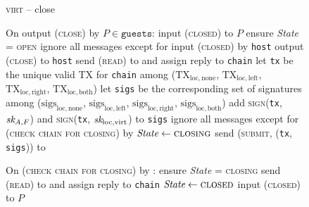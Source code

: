 \begin{figure}[H]
  \begin{processbox}{\textsc{virt} -- close}
    \begin{algorithmic}[1]
      \State On output (\textsc{close}) by $P \in \texttt{guests}$:
      \Indent
          \State input (\textsc{closed}) to $P$
        \EndIf
        \State ensure \textit{State} = \textsc{open}
         
          \State ignore all messages except for input (\textsc{closed}) by
          \texttt{host}
          \State output (\textsc{close}) to \texttt{host}
        \EndIf
        \State {}
        \State send (\textsc{read}) to \ledger and assign reply to
        \texttt{chain}
        \State let \texttt{tx} be the unique valid TX for \texttt{chain} among
        ($\mathrm{TX}_{\mathrm{loc}, \mathrm{none}}$,
        $\mathrm{TX}_{\mathrm{loc}, \mathrm{left}}$, $\mathrm{TX}_{\mathrm{loc},
        \mathrm{right}}$, $\mathrm{TX}_{\mathrm{loc}, \mathrm{both}}$)
        \State let \texttt{sigs} be the corresponding set of signatures among
        ($\mathrm{sigs}_{\mathrm{loc}, \mathrm{none}}$,
        $\mathrm{sigs}_{\mathrm{loc}, \mathrm{left}}$,
        $\mathrm{sigs}_{\mathrm{loc}, \mathrm{right}}$,
        $\mathrm{sigs}_{\mathrm{loc}, \mathrm{both}}$)
        \State add \textsc{sign}(\texttt{tx}, $\textit{sk}_{A, F}$) and
        \textsc{sign}(\texttt{tx}, $\textit{sk}_{\mathrm{loc}, \mathrm{virt}}$) to
        \texttt{sigs} 
        \State ignore all messages except for (\textsc{check chain for closing})
        by \environment
        \State $\textit{State} \gets \textsc{closing}$
        \State send (\textsc{submit}, (\texttt{tx}, \texttt{sigs})) to \ledger
      \EndIndent
      \Statex

      \State On (\textsc{check chain for closing}) by \environment:
      \Indent
        \State ensure \textit{State} = \textsc{closing}
        \State send (\textsc{read}) to \ledger and assign reply to
        \texttt{chain}
          \State $\textit{State} \gets \textsc{closed}$
          \State input (\textsc{closed}) to $P$
        \EndIf
      \EndIndent
    \end{algorithmic}
  \end{processbox}
  \caption{}
  \label{code:virtual-layer:close}
\end{figure}

